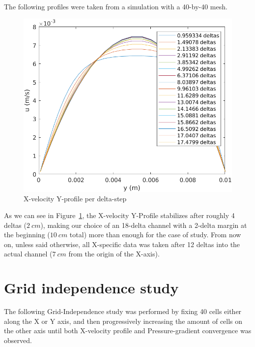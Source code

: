 \documentclass[12pt]{article}
\begin{document}
        The following profiles were taken from a simulation with a 40-by-40 mesh.

        \begin{figure}[!ht]
                \includegraphics[width=\textwidth]{Fully_Developed_Analysis.png}
                \centering
                \caption{X-velocity Y-profile per delta-step}
                \label{fig:delta-steps}
        \end{figure}

        As we can see in Figure~\ref{fig:delta-steps}, the X-velocity Y-Profile stabilizes after roughly 4 deltas ($ 2 \: cm $), making our choice of an 18-delta channel with a 2-delta margin at the beginning ($ 10 \: cm $ total) more than enough for the case of study. From now on, unless said otherwise, all X-specific data was taken after 12 deltas into the actual channel ($ 7 \: cm $ from the origin of the X-axis).

\section{Grid independence study} \label{sec:independence}

        The following Grid-Independence study was performed by fixing 40 cells either along the X or Y axis, and then progressively increasing the amount of cells on the other axis until both X-velocity profile and Pressure-gradient convergence was observed.
\end{document}
